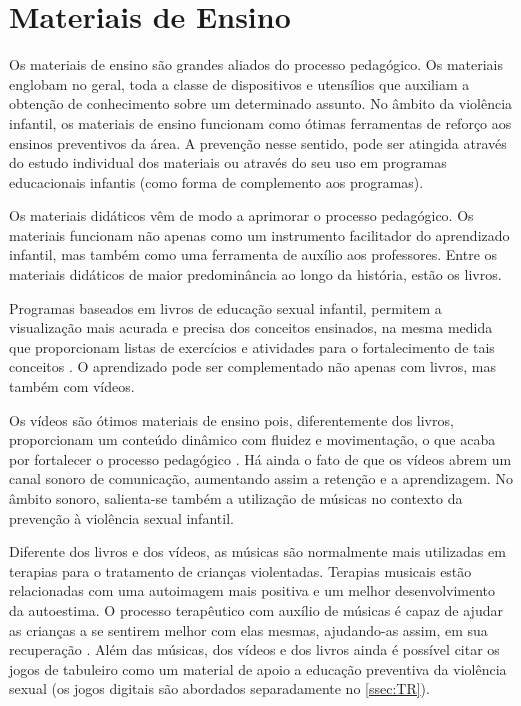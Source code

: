 \section{Materiais de Ensino}\label{sec:materiais} 

Os materiais de ensino são grandes aliados do processo pedagógico. Os materiais englobam no geral, toda a classe de dispositivos e utensílios que auxiliam a obtenção de conhecimento sobre um determinado assunto. No âmbito da violência infantil, os materiais de ensino funcionam como ótimas ferramentas de reforço aos ensinos preventivos da área. A prevenção nesse sentido, pode ser atingida através do estudo individual dos materiais ou através do seu uso em programas educacionais infantis (como forma de complemento aos programas).

Os materiais didáticos vêm de modo a aprimorar o processo pedagógico. Os materiais funcionam não apenas como um instrumento facilitador do aprendizado infantil, mas também como uma ferramenta de auxílio aos professores. Entre os materiais didáticos de maior predominância ao longo da história, estão os livros.

Programas baseados em livros de educação sexual infantil, permitem a visualização mais acurada e precisa dos conceitos ensinados, na mesma medida que proporcionam listas de exercícios e atividades para o fortalecimento de tais conceitos \cite{maria2010papel}. O aprendizado pode ser complementado não apenas com livros, mas também com vídeos.

Os vídeos são ótimos materiais de ensino pois, diferentemente dos livros, proporcionam um conteúdo dinâmico com fluidez e movimentação, o que acaba por fortalecer o processo pedagógico \cite{maria2010papel}. Há ainda o fato de que os vídeos abrem um canal sonoro de comunicação, aumentando assim a retenção e a aprendizagem. No âmbito sonoro, salienta-se também a utilização de músicas no contexto da prevenção à violência sexual infantil.

Diferente dos livros e dos vídeos, as músicas são normalmente mais utilizadas em terapias para o tratamento de crianças violentadas. Terapias musicais estão relacionadas com uma autoimagem mais positiva e um melhor desenvolvimento da autoestima. O processo terapêutico com auxílio de músicas é capaz de ajudar as crianças a se sentirem melhor com elas mesmas, ajudando-as assim, em sua recuperação \cite{robarts2003healing}. Além das músicas, dos vídeos e dos livros ainda é possível citar os jogos de tabuleiro como um material de apoio a educação preventiva da violência sexual (os jogos digitais são abordados separadamente no \autoref{ssec:TR}).

